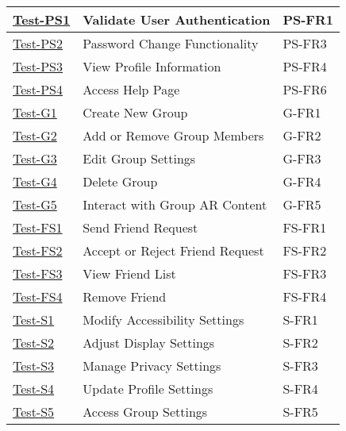 \documentclass[12pt, titlepage]{article}
\begin{document}
\begin{table}[htpb!]
  \centering
  \begin{tabular}{|l|p{8cm}|p{3cm}|}
    \hline
    \hyperref[itm:Test-PS1]{Test-PS1} & Validate User Authentication          & PS-FR1 \\
    \hline
    \hyperref[itm:Test-PS2]{Test-PS2} & Password Change Functionality         & PS-FR3 \\
    \hline
    \hyperref[itm:Test-PS3]{Test-PS3} & View Profile Information              & PS-FR4 \\
    \hline
    \hyperref[itm:Test-PS4]{Test-PS4} & Access Help Page                      & PS-FR6 \\
    \hline
    \hyperref[itm:Test-G1]{Test-G1}   & Create New Group                      & G-FR1  \\
    \hline
    \hyperref[itm:Test-G2]{Test-G2}   & Add or Remove Group Members           & G-FR2  \\
    \hline
    \hyperref[itm:Test-G3]{Test-G3}   & Edit Group Settings                   & G-FR3  \\
    \hline
    \hyperref[itm:Test-G4]{Test-G4}   & Delete Group                          & G-FR4  \\
    \hline
    \hyperref[itm:Test-G5]{Test-G5}   & Interact with Group AR Content        & G-FR5  \\
    \hline
    \hyperref[itm:Test-FS1]{Test-FS1} & Send Friend Request                   & FS-FR1 \\
    \hline
    \hyperref[itm:Test-FS2]{Test-FS2} & Accept or Reject Friend Request       & FS-FR2 \\
    \hline
    \hyperref[itm:Test-FS3]{Test-FS3} & View Friend List                      & FS-FR3 \\
    \hline
    \hyperref[itm:Test-FS4]{Test-FS4} & Remove Friend                         & FS-FR4 \\
    \hline
    \hyperref[itm:Test-S1]{Test-S1}   & Modify Accessibility Settings         & S-FR1  \\
    \hline
    \hyperref[itm:Test-S2]{Test-S2}   & Adjust Display Settings               & S-FR2  \\
    \hline
    \hyperref[itm:Test-S3]{Test-S3}   & Manage Privacy Settings               & S-FR3  \\
    \hline
    \hyperref[itm:Test-S4]{Test-S4}   & Update Profile Settings               & S-FR4  \\
    \hline
    \hyperref[itm:Test-S5]{Test-S5}   & Access Group Settings                 & S-FR5  \\

\end{tabular}
\end{table}
\end{document}
